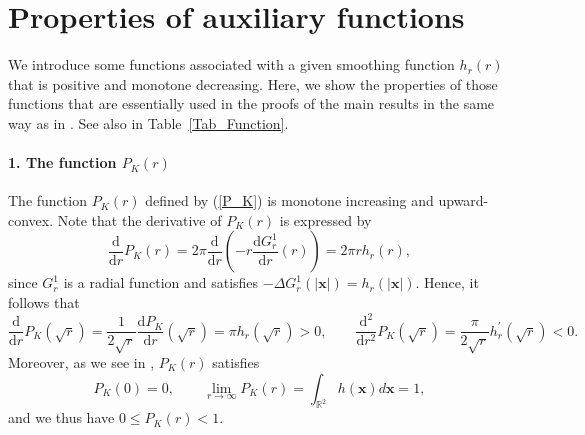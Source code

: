\documentclass{article}
\theoremstyle{definition}
\begin{document}
\appendix
\section{Properties of auxiliary functions}
\label{functions}

We introduce some functions associated with a given smoothing function $h_r(r)$ that is positive and monotone decreasing.
Here, we show the properties of those functions that are essentially used in the proofs of the main results in the same way as
in \cite{G.2}. See also in Table~\ref{Tab_Function}.

\paragraph{1. The function $P_K(r)$} The function $P_K(r)$ defined by (\ref{P_K})
is monotone increasing and upward-convex. Note that the derivative of $P_K(r)$ is expressed by 
\begin{equation*}
\frac{\mbox{d}}{\mbox{d}r} P_K(r) = 2 \pi \frac{\mbox{d}}{\mbox{d}r} \left( - r \frac{\mbox{d}G_r^1}{\mbox{d}r} (r) \right) = 2 \pi r h_r(r),
\end{equation*}
since $G^1_r$ is a radial function and satisfies   $- \Delta G_r^1(\vert{\bm x}\vert) = h_r(\vert{\bm x}\vert)$. Hence, it follows that
\begin{equation}
\frac{\mbox{d}}{\mbox{d}r} P_K(\sqrt{r}) = \frac{1}{2 \sqrt{r}} \frac{\mbox{d} P_K}{\mbox{d}r}(\sqrt{r}) = \pi h_r(\sqrt{r}) > 0, \qquad 
\frac{\mbox{d}^2}{\mbox{d}r^2} P_K(\sqrt{r}) = \frac{\pi}{2 \sqrt{r}} h^\prime_r(\sqrt{r}) < 0.
\label{Apdx_P_K}
\end{equation}
Moreover, as we see in \cite{G.3}, $P_K(r)$ satisfies
\begin{equation*}
P_K(0) = 0, \qquad \lim_{r \rightarrow \infty} P_K(r) = \int_{\mathbb{R}^2} h({\bm x}) d{\bm x} =  1,
\end{equation*}
and we thus have $0 \leq P_K(r) < 1$. 
\end{document}
